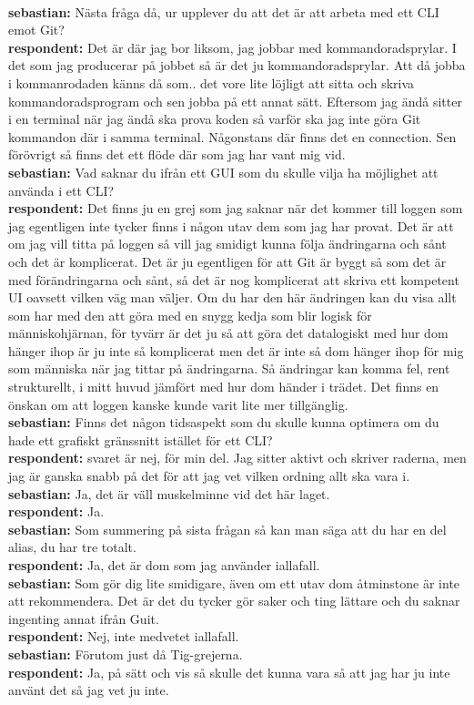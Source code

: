 \documentclass[a4paper,oneside]{bth} %
\begin{document}
		\\\textbf{sebastian:} Nästa fråga då, ur upplever du att det är att arbeta med ett CLI emot Git?
		\\\textbf{respondent:} Det är där jag bor liksom, jag jobbar med kommandoradsprylar. I det som jag producerar på jobbet så är det ju kommandoradsprylar. Att då jobba i kommanrodaden känns då som.. det vore lite löjligt att sitta och skriva kommandoradsprogram och sen jobba på ett annat sätt.
		Eftersom jag ändå sitter i en terminal när jag ändå ska prova koden så varför ska jag inte göra Git kommandon där i samma terminal. Någonstans där finns det en connection. 
		Sen förövrigt så finns det ett flöde där som jag har vant mig vid.
		\\\textbf{sebastian:} Vad saknar du ifrån ett GUI som du skulle vilja ha möjlighet att använda i ett CLI?
		\\\textbf{respondent:} Det finns ju en grej som jag saknar när det kommer till loggen som jag egentligen inte tycker finns i någon utav dem som jag har provat.
		Det är att om jag vill titta på loggen så vill jag smidigt kunna följa ändringarna och sånt och det är komplicerat. Det är ju egentligen för att Git är byggt så som det är med förändringarna och sånt, så det är nog komplicerat att skriva ett kompetent UI oavsett vilken väg man väljer.
		Om du har den här ändringen kan du visa allt som har med den att göra med en snygg kedja som blir logisk för människohjärnan, för tyvärr är det ju så att göra det datalogiskt med hur dom hänger ihop är ju inte så komplicerat men det är inte så dom hänger ihop för mig som människa när jag tittar på ändringarna. Så ändringar kan komma fel, rent strukturellt, i mitt huvud jämfört med hur dom händer i trädet.
		Det finns en önskan om att loggen kanske kunde varit lite mer tillgänglig.
		\\\textbf{sebastian:} Finns det någon tidsaspekt som du skulle kunna optimera om du hade ett grafiskt gränssnitt istället för ett CLI?
		\\\textbf{respondent:} svaret är nej, för min del. Jag sitter aktivt och skriver raderna, men jag är ganska snabb på det för att jag vet vilken ordning allt ska vara i.
		\\\textbf{sebastian:} Ja, det är väll muskelminne vid det här laget.
		\\\textbf{respondent:} Ja.
		\\\textbf{sebastian:} Som summering på sista frågan så kan man säga att du har en del alias, du har tre totalt.
		\\\textbf{respondent:} Ja, det är dom som jag använder iallafall.
		\\\textbf{sebastian:} Som gör dig lite smidigare, även om ett utav dom åtminstone är inte att rekommendera. Det är det du tycker gör saker och ting lättare och du saknar ingenting annat ifrån Guit.
		\\\textbf{respondent:} Nej, inte medvetet iallafall.
		\\\textbf{sebastian:} Förutom just då Tig-grejerna.
		\\\textbf{respondent:} Ja, på sätt och vis så skulle det kunna vara så att jag har ju inte använt det så jag vet ju inte.
		
\end{document}
